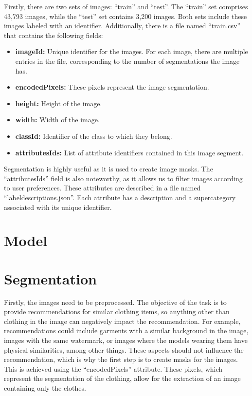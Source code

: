 \documentclass[12pt]{report} %
\begin{document}
Firstly, there are two sets of images: ``train'' and ``test''. The ``train'' set comprises 43,793 images, while the ``test'' set contains 3,200 images. Both sets include these images labeled with an identifier.
Additionally, there is a file named ``train.csv'' that contains the following fields:

\begin{itemize}
	\item \textbf{imageId:} Unique identifier for the images. For each image, there are multiple entries in the file, corresponding to the number of segmentations the image has.
	\item \textbf{encodedPixels:} These pixels represent the image segmentation.
	\item \textbf{height:} Height of the image.
	\item \textbf{width:} Width of the image.
	\item \textbf{classId:} Identifier of the class to which they belong.
	\item \textbf{attributesIds:} List of attribute identifiers contained in this image segment.
\end{itemize}

Segmentation is highly useful as it is used to create image masks. The ``attributesIds'' field is also noteworthy, as it allows us to filter images according to user preferences. These attributes are described in a file named ``label\textunderscore descriptions.json''. Each attribute has a description and a supercategory associated with its unique identifier.

\section*{Model}
\section*{Segmentation}
Firstly, the images need to be preprocessed. The objective of the task is to provide recommendations for similar clothing items, so anything other than clothing in the image can negatively impact the recommendation. For example, recommendations could include garments with a similar background in the image, images with the same watermark, or images where the models wearing them have physical similarities, among other things. These aspects should not influence the recommendation, which is why the first step is to create masks for the images. This is achieved using the ``encodedPixels'' attribute. These pixels, which represent the segmentation of the clothing, allow for the extraction of an image containing only the clothes.
\end{document}
